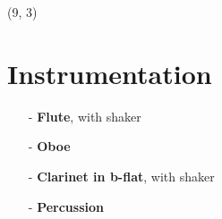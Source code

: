 \documentclass[10pt]{article}
\begin{document}
\begin{textblock}{14} (9, 3)

\section{Instrumentation}

\begin{itemize}

    \item[-] \textbf{Flute}, with shaker \\

    \item[-] \textbf{Oboe} \\

    \item[-] \textbf{Clarinet in b-flat}, with shaker \\

    \item[-] \textbf{Percussion} \\


\end{itemize}
\end{textblock}
\end{document}
